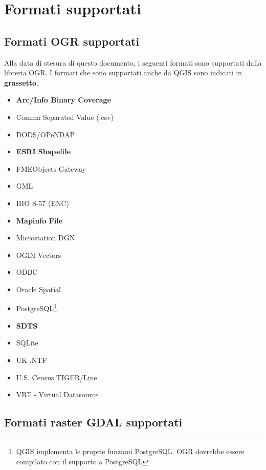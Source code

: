 \section{Formati supportati}\label{appdx_data_formats}


\subsection{Formati OGR supportati}\label{appdx_ogr}

Alla data di stesura di questo documento, i seguenti formati sono supportati dalla libreria OGR. I formati che sono supportati anche da QGIS sono indicati in \textbf{grassetto}.

\begin{itemize}
\item \textbf{Arc/Info Binary Coverage}
\item Comma Separated Value (.csv) 
\item DODS/OPeNDAP
\item \textbf{ESRI Shapefile}
\item FMEObjects Gateway
\item GML
\item IHO S-57 (ENC)
\item \textbf{Mapinfo File}
\item Microstation DGN
\item OGDI Vectors
\item ODBC
\item Oracle Spatial
\item PostgreSQL\footnote{QGIS implementa le proprie funzioni PostgreSQL. OGR dovrebbe essere compilato con il supporto a PostgreSQL}
\item \textbf{SDTS}
\item SQLite
\item UK .NTF
\item U.S. Census TIGER/Line
\item VRT - Virtual Datasource
\end{itemize}

\subsection{Formati raster GDAL supportati}\label{appdx_gdal}

